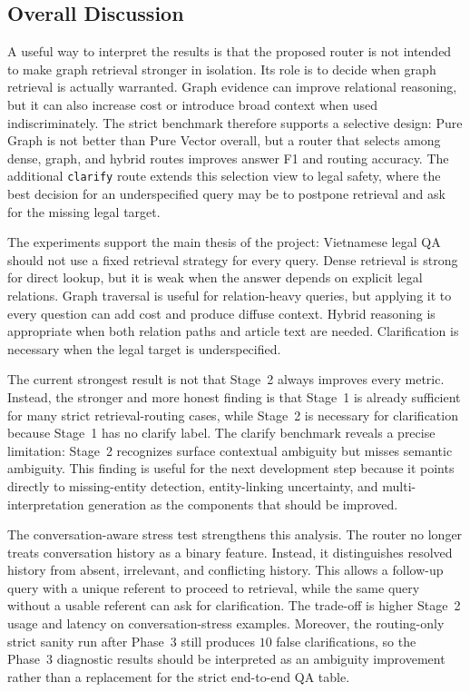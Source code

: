 \documentclass[11pt,twocolumn]{article}
\begin{document}
\subsection{Overall Discussion}
\label{subsec:overall_discussion}

A useful way to interpret the results is that the proposed
router is not intended to make graph retrieval stronger in
isolation. Its role is to decide when graph retrieval is
actually warranted. Graph evidence can improve relational
reasoning, but it can also increase cost or introduce broad
context when used indiscriminately. The strict benchmark
therefore supports a selective design: Pure Graph is not
better than Pure Vector overall, but a router that selects
among dense, graph, and hybrid routes improves answer F1 and
routing accuracy. The additional \texttt{clarify} route
extends this selection view to legal safety, where the best
decision for an underspecified query may be to postpone
retrieval and ask for the missing legal target.

The experiments support the main thesis of the project:
Vietnamese legal QA should not use a fixed retrieval strategy
for every query. Dense retrieval is strong for direct lookup,
but it is weak when the answer depends on explicit legal
relations. Graph traversal is useful for relation-heavy
queries, but applying it to every question can add cost and
produce diffuse context. Hybrid reasoning is appropriate when
both relation paths and article text are needed. Clarification
is necessary when the legal target is underspecified.

The current strongest result is not that Stage~2 always
improves every metric. Instead, the stronger and more honest
finding is that Stage~1 is already sufficient for many strict
retrieval-routing cases, while Stage~2 is necessary for
clarification because Stage~1 has no clarify label. The
clarify benchmark reveals a precise limitation: Stage~2
recognizes surface contextual ambiguity but misses semantic
ambiguity. This finding is useful for the next development
step because it points directly to missing-entity detection,
entity-linking uncertainty, and multi-interpretation
generation as the components that should be improved.

The conversation-aware stress test strengthens this analysis.
The router no longer treats conversation history as a binary
feature. Instead, it distinguishes resolved history from
absent, irrelevant, and conflicting history. This allows a
follow-up query with a unique referent to proceed to retrieval,
while the same query without a usable referent can ask for
clarification. The trade-off is higher Stage~2 usage and
latency on conversation-stress examples. Moreover, the
routing-only strict sanity run after Phase~3 still produces
$10$ false clarifications, so the Phase~3 diagnostic results
should be interpreted as an ambiguity improvement rather than
a replacement for the strict end-to-end QA table.
\end{document}
